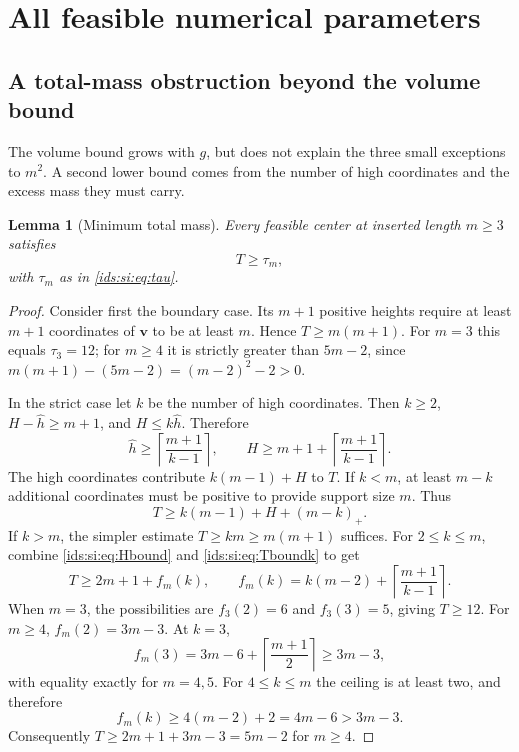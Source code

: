 \documentclass[11pt,letterpaper]{article}
\newtheorem{lemma}[theorem]{Lemma}
\theoremstyle{definition}\newtheorem{definition}[theorem]{Definition}
\theoremstyle{remark}\newtheorem{remark}[theorem]{Remark}
\theoremstyle{definition}\newtheorem{question}[theorem]{Question}
\begin{document}
\section{All feasible numerical parameters}\label{ids:si:sec:threshold}

\subsection{A total-mass obstruction beyond the volume bound}
The volume bound grows with $g$, but does not explain the three small
exceptions to $m^2$. A second lower bound comes from the number of high
coordinates and the excess mass they must carry.

\begin{lemma}[Minimum total mass]\label{ids:si:lem:mass}
Every feasible center at inserted length $m\geq3$ satisfies
\begin{equation}\label{ids:si:eq:mass}
 T\geq\tau_m,
\end{equation}
with $\tau_m$ as in \eqref{ids:si:eq:tau}.
\end{lemma}
\begin{proof}
Consider first the boundary case. Its $m+1$ positive heights require at
least $m+1$ coordinates of $\mathbf v$ to be at least $m$. Hence
$T\geq m(m+1)$. For $m=3$ this equals $\tau_3=12$; for $m\geq4$ it is
strictly greater than $5m-2$, since
$m(m+1)-(5m-2)=(m-2)^2-2>0$.

In the strict case let $k$ be the number of high coordinates. Then $k\geq2$,
$H-\hat h\geq m+1$, and $H\leq k\hat h$. Therefore
\begin{equation}\label{ids:si:eq:Hbound}
 \hat h\geq\left\lceil\frac{m+1}{k-1}\right\rceil,\qquad
 H\geq m+1+\left\lceil\frac{m+1}{k-1}\right\rceil.
\end{equation}
The high coordinates contribute $k(m-1)+H$ to $T$. If $k<m$, at least
$m-k$ additional coordinates must be positive to provide support size $m$.
Thus
\begin{equation}\label{ids:si:eq:Tboundk}
 T\geq k(m-1)+H+(m-k)_+.
\end{equation}
If $k>m$, the simpler estimate $T\geq km\geq m(m+1)$ suffices.
For $2\leq k\leq m$, combine \eqref{ids:si:eq:Hbound} and \eqref{ids:si:eq:Tboundk} to get
\begin{equation}\label{ids:si:eq:fk}
 T\geq 2m+1+f_m(k),\qquad
 f_m(k)=k(m-2)+\left\lceil\frac{m+1}{k-1}\right\rceil.
\end{equation}
When $m=3$, the possibilities are $f_3(2)=6$ and $f_3(3)=5$, giving
$T\geq12$. For $m\geq4$, $f_m(2)=3m-3$. At $k=3$,
\[
 f_m(3)=3m-6+\left\lceil\frac{m+1}{2}\right\rceil\geq3m-3,
\]
with equality exactly for $m=4,5$. For $4\leq k\leq m$ the ceiling is at
least two, and therefore
\[
 f_m(k)\geq4(m-2)+2=4m-6>3m-3.
\]
Consequently $T\geq2m+1+3m-3=5m-2$ for $m\geq4$.
\end{proof}
\end{document}
